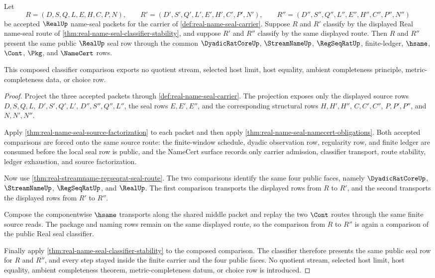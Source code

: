 \begin{theorem}
\label{thm:real-name-seal-classifier-transitivity}
Let
$$
R=(D,S,Q,L,E,H,C,P,N),\qquad
R'=(D',S',Q',L',E',H',C',P',N'),\qquad
R''=(D'',S'',Q'',L'',E'',H'',C'',P'',N'')
$$
be accepted $\RealUp$ name-seal packets for the carrier of \autoref{def:real-name-seal-carrier}. Suppose $R$ and $R'$ classify by the displayed Real name-seal route of \autoref{thm:real-name-seal-classifier-stability}, and suppose $R'$ and $R''$ classify by the same displayed route. Then $R$ and $R''$ present the same public $\RealUp$ seal row through the common $\DyadicRatCoreUp$, $\StreamNameUp$, $\RegSeqRatUp$, finite-ledger, $\hsame$, $\Cont$, $\Pkg$, and $\NameCert$ rows.

This composed classifier comparison exports no quotient stream, selected host limit, host equality, ambient completeness principle, metric-completeness data, or choice row.
\end{theorem}
\begin{proof}
Project the three accepted packets through \autoref{def:real-name-seal-carrier}. The projection exposes only the displayed source rows $D,S,Q,L$, $D',S',Q',L'$, $D'',S'',Q'',L''$, the seal rows $E,E',E''$, and the corresponding structural rows $H,H',H''$, $C,C',C''$, $P,P',P''$, and $N,N',N''$.

Apply \autoref{thm:real-name-seal-source-factorization} to each packet and then apply \autoref{thm:real-name-seal-namecert-obligations}. Both accepted comparisons are forced onto the same source route: the finite-window schedule, dyadic observation row, regularity row, and finite ledger are consumed before the local seal row is public, and the NameCert surface records only carrier admission, classifier transport, route stability, ledger exhaustion, and source factorization.

Now use \autoref{thm:real-streamname-regseqrat-seal-route}. The two comparisons identify the same four public faces, namely $\DyadicRatCoreUp$, $\StreamNameUp$, $\RegSeqRatUp$, and $\RealUp$. The first comparison transports the displayed rows from $R$ to $R'$, and the second transports the displayed rows from $R'$ to $R''$.

Compose the componentwise $\hsame$ transports along the shared middle packet and replay the two $\Cont$ routes through the same finite source reads. The package and naming rows remain on the same displayed route, so the comparison from $R$ to $R''$ is again a comparison of the public Real seal classifier.

Finally apply \autoref{thm:real-name-seal-classifier-stability} to the composed comparison. The classifier therefore presents the same public seal row for $R$ and $R''$, and every step stayed inside the finite carrier and the four public faces. No quotient stream, selected host limit, host equality, ambient completeness theorem, metric-completeness datum, or choice row is introduced.
\end{proof}

